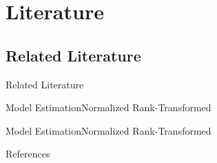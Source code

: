 \documentclass{beamer}
\begin{document}
	\section{Literature}
	
	
	
	
	
	
	
	
	\normalsize
	

	
	
	\subsection{Related Literature}
	\begin{frame}{Related Literature}\label{Grapgh}
		\resizebox{\textwidth}{!}{
			
		}
		
	\end{frame}
	
	\begin{frame}{Model Estimation}{Normalized Rank-Transformed}
	\label{mresult2part1} 
	\begin{table}[htbp]
		\centering
		\resizebox{0.8\textwidth}{!}{
			
		}
	\end{table}
	
	
\end{frame}
\begin{frame}{Model Estimation}{Normalized Rank-Transformed}
	\label{mresult2part2} 
	\begin{table}[htbp]
		\centering
		\resizebox{1\textwidth}{!}{
			
		}
	\end{table}
\end{frame}
	
	\normalsize
	
		\appendix
	
	\tiny
\begin{frame}[allowframebreaks]{References}
	
	{		
		
		
	}
\end{frame}
	
\end{document}
